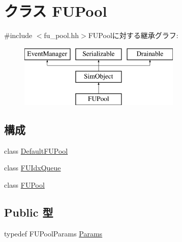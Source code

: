 \hypertarget{classFUPool}{
\section{クラス FUPool}
\label{classFUPool}
}


{\ttfamily \#include $<$fu\_\-pool.hh$>$}FUPoolに対する継承グラフ:\begin{figure}[H]
\begin{center}
\leavevmode
\includegraphics[height=3cm]{classFUPool}
\end{center}
\end{figure}
\subsection*{構成}
\begin{DoxyCompactItemize}
\item 
class \hyperlink{classFUPool_1_1DefaultFUPool}{DefaultFUPool}
\item 
class \hyperlink{classFUPool_1_1FUIdxQueue}{FUIdxQueue}
\item 
class \hyperlink{classFUPool_1_1FUPool}{FUPool}
\end{DoxyCompactItemize}
\subsection*{Public 型}
\begin{DoxyCompactItemize}
\item 
typedef FUPoolParams \hyperlink{classFUPool_a9d3633c4c2cf6388d3099abc3b5c8eb2}{Params}
\end{DoxyCompactItemize}
